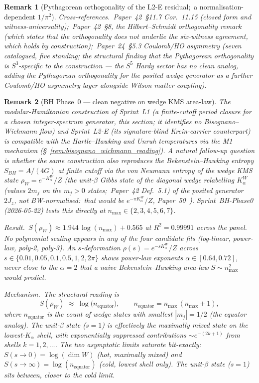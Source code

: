 \documentclass[11pt]{article}
\newtheorem{remark}{Remark}
\begin{document}
\begin{remark}[Pythagorean orthogonality of the L2-E residual;\ a normalisation-dependent $1/\pi^2$]
\emph{Cross-references.}\ Paper~42~\S 11.7
Cor.~11.15 (closed form and witness-universality);\ Paper~42~\S 8,
the Hilbert--Schmidt orthogonality remark (which states that the
orthogonality does \emph{not} underlie the six-witness agreement, which
holds by construction);\
Paper~24~\S 5.3 Coulomb/HO asymmetry (seven catalogued, five standing; the structural
finding that the Pythagorean orthogonality is $S^3$-specific to
the construction --- the $S^5$ Hardy sector has no clean analog,
adding the Pythagorean orthogonality for the posited wedge generator
as a further Coulomb/HO asymmetry layer alongside Wilson matter
coupling).
\end{remark}

\begin{remark}[BH Phase~0 — clean negative on wedge KMS area-law]
\label{rem:bh_phase0_negative}
The modular-Hamiltonian construction of Sprint~L1 (a finite-cutoff
period closure for a chosen integer-spectrum generator, this section;
it identifies no Bisognano--Wichmann flow) and Sprint~L2-E (its
signature-blind Krein-carrier counterpart) is compatible with the
Hartle--Hawking and Unruh \emph{temperatures} via the M1 mechanism
(\S~\ref{rem:bisognano_wichmann_reading}).  A
natural follow-up question is whether the same construction also
reproduces the Bekenstein--Hawking \emph{entropy} $S_{BH} = A/(4G)$ at
finite cutoff via the von Neumann entropy of the wedge KMS state
$\rho_W = e^{-K_\alpha^W}/Z$ (the unit-$\beta$ Gibbs state of
the diagonal wedge relabelling $K_\alpha^W$ (values $2m_j$ on the $m_j > 0$ states;\ Paper~42 Def.~5.1) of the posited generator $2J_z$, not
BW-normalised:\ that would be $e^{-\pi K_\alpha^W}/Z$,
Paper~50~\cite{loutey_paper50}).  Sprint~BH-Phase0
(2026-05-22) tests
this directly at $n_{\max} \in \{2, 3, 4, 5, 6, 7\}$.

\emph{Result.}\ $S(\rho_W) \approx 1.944\,\log(n_{\max}) + 0.565$ at
$R^2 = 0.99991$ across the panel.  No polynomial scaling appears in
any of the four candidate fits (log-linear, power-law, poly-2,
poly-3).  An $s$-deformation $\rho(s) = e^{-s K_\alpha^W}/Z$ across
$s \in \{0.01, 0.05, 0.1, 0.5, 1, 2, 2\pi\}$ shows power-law exponents
$\alpha \in [0.64, 0.72]$, never close to the $\alpha = 2$ that a
naive Bekenstein--Hawking area-law $S \sim n_{\max}^2$ would predict.

\emph{Mechanism.}\ The structural reading is
\[
   S(\rho_W) \;\approx\; \log\bigl(n_{\mathrm{equator}}\bigr),
   \qquad n_{\mathrm{equator}} = n_{\max}\,(n_{\max} + 1),
\]
where $n_{\mathrm{equator}}$ is the count of wedge states with smallest
$|m_j| = 1/2$ (the equator analog).  The unit-$\beta$ state ($s = 1$) is
effectively the maximally mixed state on the lowest-$K_\alpha$ shell,
with exponentially suppressed contributions $\sim e^{-(2k+1)}$ from
shells $k = 1, 2, \dots$.  The two asymptotic limits saturate
bit-exactly:\ $S(s \to 0) = \log(\dim W)$ (hot, maximally mixed) and
$S(s \to \infty) = \log(n_{\mathrm{equator}})$ (cold, lowest shell
only).  The unit-$\beta$ state ($s = 1$) sits between, closer to the cold
limit.


\end{remark}
\end{document}
